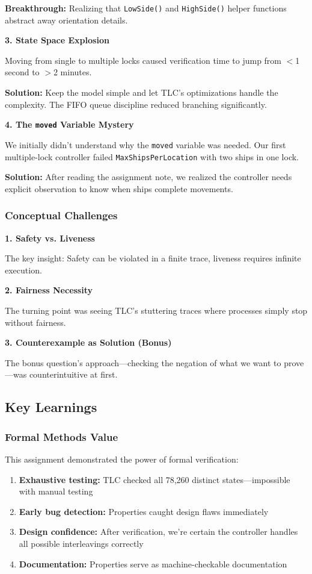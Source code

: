 \documentclass[12pt,a4paper]{article}
\begin{document}
\textbf{Breakthrough:} Realizing that \texttt{LowSide()} and \texttt{HighSide()} helper functions abstract away orientation details.

\textbf{3. State Space Explosion}

Moving from single to multiple locks caused verification time to jump from $<$1 second to $>$2 minutes.

\textbf{Solution:} Keep the model simple and let TLC's optimizations handle the complexity. The FIFO queue discipline reduced branching significantly.

\textbf{4. The \texttt{moved} Variable Mystery}

We initially didn't understand why the \texttt{moved} variable was needed. Our first multiple-lock controller failed \texttt{MaxShipsPerLocation} with two ships in one lock.

\textbf{Solution:} After reading the assignment note, we realized the controller needs explicit observation to know when ships complete movements.

\subsubsection{Conceptual Challenges}

\textbf{1. Safety vs. Liveness}

The key insight: Safety can be violated in a finite trace, liveness requires infinite execution.

\textbf{2. Fairness Necessity}

The turning point was seeing TLC's stuttering traces where processes simply stop without fairness.

\textbf{3. Counterexample as Solution (Bonus)}

The bonus question's approach---checking the negation of what we want to prove---was counterintuitive at first.

\subsection{Key Learnings}

\subsubsection{Formal Methods Value}

This assignment demonstrated the power of formal verification:

\begin{enumerate}
    \item \textbf{Exhaustive testing:} TLC checked all 78,260 distinct states---impossible with manual testing
    \item \textbf{Early bug detection:} Properties caught design flaws immediately
    \item \textbf{Design confidence:} After verification, we're certain the controller handles all possible interleavings correctly
    \item \textbf{Documentation:} Properties serve as machine-checkable documentation
\end{enumerate}
\end{document}
